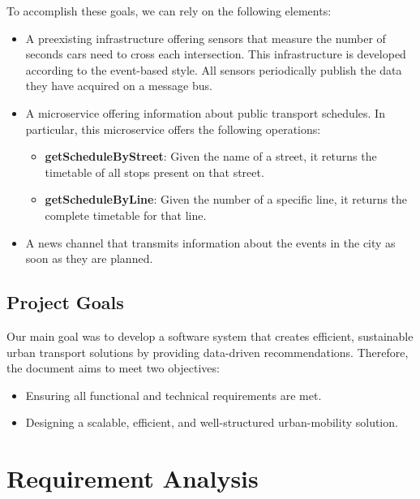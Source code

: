 \documentclass[a4paper,12pt]{article}
\begin{document}
\noindent To accomplish these goals, we can rely on the following elements: 
\begin{itemize}
    \item A preexisting infrastructure offering sensors that measure the number of seconds cars need to cross each intersection. This infrastructure is developed according to the event-based style. All sensors periodically publish the data they have acquired on a message bus. 
    \item A microservice offering information about public transport schedules. In particular, this microservice offers the following operations: 
    \begin{itemize} 
        \item \textbf{getScheduleByStreet}: Given the name of a street, it returns the timetable of all stops present on that street. 
        \item \textbf{getScheduleByLine}: Given the number of a specific line, it returns the complete timetable for that line.   
    \end{itemize}
    \item A news channel that transmits information about the events in the city as soon as they are planned.
\end{itemize}

\subsection*{Project Goals}
Our main goal was to develop a software system that creates efficient, sustainable urban transport solutions by providing data-driven recommendations. Therefore, the document aims to meet two objectives: 
\begin{itemize}
    \item Ensuring all functional and technical requirements are met.
    \item Designing a scalable, efficient, and well-structured urban-mobility solution.
\end{itemize}

\newpage

\section{Requirement Analysis}
\end{document}
